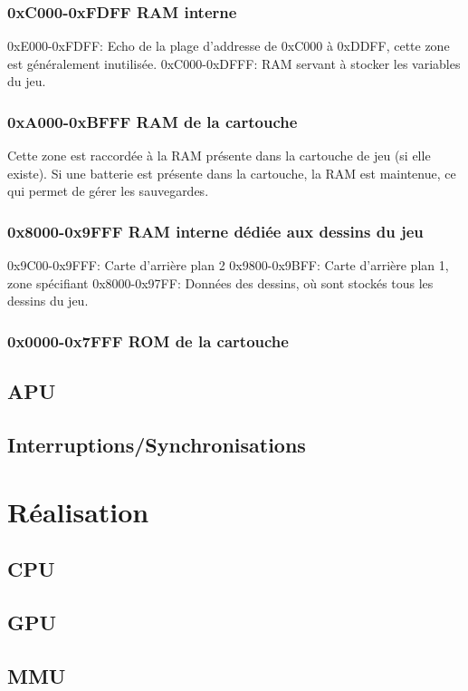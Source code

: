 \documentclass{report}
\begin{document}
\subsection{0xC000-0xFDFF RAM interne}

0xE000-0xFDFF: Echo de la plage d'addresse de 0xC000 à 0xDDFF, cette zone est
généralement inutilisée.
0xC000-0xDFFF: RAM servant à stocker les variables du jeu.

\subsection{0xA000-0xBFFF RAM de la cartouche}
Cette zone est raccordée à la RAM présente dans la cartouche de jeu (si elle
existe). Si une batterie est présente dans la cartouche, la RAM est maintenue,
ce qui permet de gérer les sauvegardes.

\subsection{0x8000-0x9FFF RAM interne dédiée aux dessins du jeu}

0x9C00-0x9FFF: Carte d'arrière plan 2 
0x9800-0x9BFF: Carte d'arrière plan 1, zone spécifiant
0x8000-0x97FF: Données des dessins, où sont stockés tous les dessins du jeu.

\subsection{0x0000-0x7FFF ROM de la cartouche}
\section{APU}
\section{Interruptions/Synchronisations}
\chapter{Réalisation}
\section{CPU}
\section{GPU}
\section{MMU}
\end{document}
